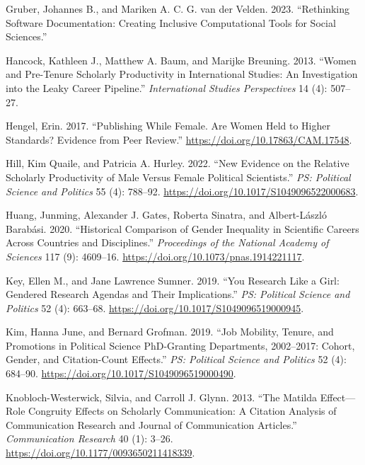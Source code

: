 \documentclass[
]{ccr}
\newlength{\cslhangindent}
\newlength{\cslentryspacingunit} %
\newenvironment{CSLReferences}[2] %
 {%
  \setlength{\parindent}{0pt}
  \ifodd #1
  \let\oldpar\par
  \def\par{\hangindent=\cslhangindent\oldpar}
  \fi
  \setlength{\parskip}{#2\cslentryspacingunit}
 }%
 {}
\begin{document}
\begin{CSLReferences}{1}{0}
\leavevmode{}%
Gruber, Johannes B., and Mariken A. C. G. van der Velden. 2023.
{``Rethinking Software Documentation: Creating Inclusive Computational
Tools for Social Sciences.''}

\leavevmode{}%
Hancock, Kathleen J., Matthew A. Baum, and Marijke Breuning. 2013.
{``Women and {Pre}-{Tenure} {Scholarly} {Productivity} in
{International} {Studies}: {An} {Investigation} into the {Leaky}
{Career} {Pipeline}.''} \emph{International Studies Perspectives} 14
(4): 507--27.

\leavevmode{}%
Hengel, Erin. 2017. {``Publishing While {Female}. {Are} Women Held to
Higher Standards? {Evidence} from Peer Review.''}
\url{https://doi.org/10.17863/CAM.17548}.

\leavevmode{}%
Hill, Kim Quaile, and Patricia A. Hurley. 2022. {``New {Evidence} on the
{Relative} {Scholarly} {Productivity} of {Male} Versus {Female}
{Political} {Scientists}.''} \emph{PS: Political Science and Politics}
55 (4): 788--92. \url{https://doi.org/10.1017/S1049096522000683}.

\leavevmode{}%
Huang, Junming, Alexander J. Gates, Roberta Sinatra, and Albert-László
Barabási. 2020. {``Historical Comparison of Gender Inequality in
Scientific Careers Across Countries and Disciplines.''}
\emph{Proceedings of the National Academy of Sciences} 117 (9):
4609--16. \url{https://doi.org/10.1073/pnas.1914221117}.

\leavevmode{}%
Key, Ellen M., and Jane Lawrence Sumner. 2019. {``You {Research} {Like}
a {Girl}: {Gendered} {Research} {Agendas} and {Their} {Implications}.''}
\emph{PS: Political Science and Politics} 52 (4): 663--68.
\url{https://doi.org/10.1017/S1049096519000945}.

\leavevmode{}%
Kim, Hanna June, and Bernard Grofman. 2019. {``Job {Mobility}, {Tenure},
and {Promotions} in {Political} {Science} {PhD}-{Granting}
{Departments}, 2002--2017: {Cohort}, {Gender}, and {Citation}-{Count}
{Effects}.''} \emph{PS: Political Science and Politics} 52 (4): 684--90.
\url{https://doi.org/10.1017/S1049096519000490}.

\leavevmode{}%
Knobloch-Westerwick, Silvia, and Carroll J. Glynn. 2013. {``The
{Matilda} {Effect}---{Role} {Congruity} {Effects} on {Scholarly}
{Communication}: {A} {Citation} {Analysis} of {Communication} {Research}
and {Journal} of {Communication} {Articles}.''} \emph{Communication
Research} 40 (1): 3--26. \url{https://doi.org/10.1177/0093650211418339}.


\end{CSLReferences}
\end{document}
